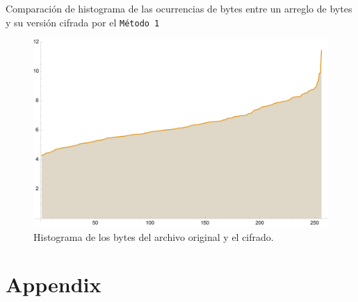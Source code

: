 Comparación de histograma de las ocurrencias de bytes entre un arreglo de bytes
y su versión cifrada por el \texttt{Método 1}

\begin{figure}[H]
    \centering
    \includegraphics[scale=0.7]{../img/historygram}
    \caption*{Histograma de los bytes del archivo
original y el cifrado.}\label{fig:d2}
\end{figure}

\newpage
\section{Appendix}

